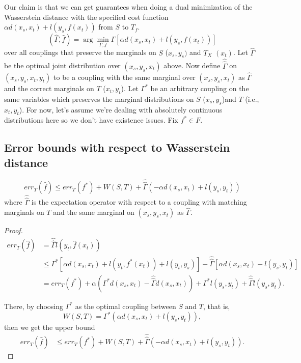 Our claim is that we can get guarantees when doing a dual minimization of the Wasserstein distance with the specified cost function $\alpha d(x_s,x_t) + l(y_s,f(x_t))$ from $S$ to $T_{f}$. 
\[
(\hat{\Gamma},\hat{f})=\arg\min_{\Gamma,f}\Gamma\left[\alpha d(x_{s},x_{t})+l(y_{s},f(x_{t}))\right]
\]
over all couplings that preserve the marginals on $S$ ($x_{s},y_{s})$ and $T_{X}$ $(x_{t})$. Let $\hat{\Gamma}$ be the optimal joint distribution over $(x_{s},y_{s},x_{t})$ above. Now define $\hat{\hat{\Gamma}}$ on $(x_{s},y_{s},x_{t},y_{t})$ to be a coupling with the same marginal over $(x_{s},y_{s},x_{t})$ as $\hat{\Gamma}$ and the correct marginals on $T$ ($x_t,y_t$). Let $\Gamma^{*}$ be an arbitrary coupling on the same variables which preserves the marginal distributions on $S$ ($x_{s},y_{s}$)and $T$ (i.e., $x_{t},y_t$). For now, let's assume we're dealing with absolutely continuous distributions here so we don't have existence issues. Fix $f^*\in F$.

\subsection{Error bounds with respect to Wasserstein distance}
\begin{theorem}
	\[
	err_{T}(\hat{f}) \leq err_{T}(f^{*})+W(S,T)+\hat{\hat{\Gamma}}\left(-\alpha d(x_{s},x_{t})+l(y_{s},y_{t})\right)
	\] where $\hat{\hat\Gamma}$ is the expectation operator with respect to a coupling with matching marginals on $T$ and the same marginal on $(x_s,y_s,x_t)$ as $\hat{\Gamma}$.
\end{theorem}

\begin{proof}
	\begin{align*}
	err_{T}(\hat{f}) &= \hat{\hat{\Gamma}} l (y_t,\hat f(x_t)) \\
	& \leq \Gamma^{*}\left[\alpha
	d(x_{s},x_{t})+l(y_{t},f^{*}(x_{t}))+l(y_{t},y_{s})\right]
	- \hat{\hat{\Gamma}}\left[\alpha d(x_{s},x_{t})-l(y_{s},y_{t})\right] \\
	& = err_{T}(f^{*})+\alpha\left(\Gamma^{*}d(x_{s},x_{t})
	-\hat{\hat{\Gamma}}d(x_{s},x_{t})\right)
	+\Gamma^{*}l(y_{s},y_{t})+\hat{\hat{\Gamma}}l(y_{s},y_{t}).
	\end{align*}
	
	There, by choosing $\Gamma^*$ as the optimal coupling between $S$ and $T$, that is,
	\[
	W(S,T) = \Gamma^*\left(\alpha d(x_{s},x_{t}) +
	l(y_{s},y_{t})\right),
	\]
	then we get the upper bound
	\begin{align*}
	err_{T}(\hat{f})
	& \leq err_{T}(f^{*})+W(S,T)+\hat{\hat{\Gamma}}\left(-\alpha
	d(x_{s},x_{t})+l(y_{s},y_{t})\right).
	\end{align*}
\end{proof}

